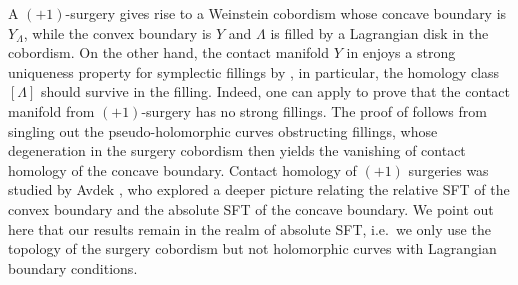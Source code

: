 \documentclass[reqno,11pt]{amsart}
\numberwithin{equation}{section}
\newtheorem{corollary}[theorem]{\textbf{Corollary}}
\begin{document}

A $(+1)$-surgery gives rise to a Weinstein cobordism whose concave boundary is $Y_{\Lambda}$, while the convex boundary is $Y$ and $\Lambda$ is filled by a Lagrangian disk in the cobordism. On the other hand, the contact manifold $Y$ in  enjoys a strong uniqueness property for symplectic fillings by \cite{zbMATH07367119,zbMATH07673358}, in particular, the homology class $[\Lambda]$ should survive in the filling. Indeed, one can apply \cite[Theorem 4.1]{bowden2022making} to prove that the contact manifold from $(+1)$-surgery has no strong fillings. The proof of  follows from singling out the pseudo-holomorphic curves obstructing fillings, whose degeneration in the surgery cobordism then yields the vanishing of contact homology of the concave boundary. Contact homology of $(+1)$ surgeries was studied by Avdek \cite{Av,avdek2020combinatorial}, who explored a deeper picture relating the relative SFT of the convex boundary and the absolute SFT of the concave boundary. We point out here that our results remain in the realm of absolute SFT, i.e.\ we only use the topology of the surgery cobordism but not holomorphic curves with Lagrangian boundary conditions.
\end{document}
